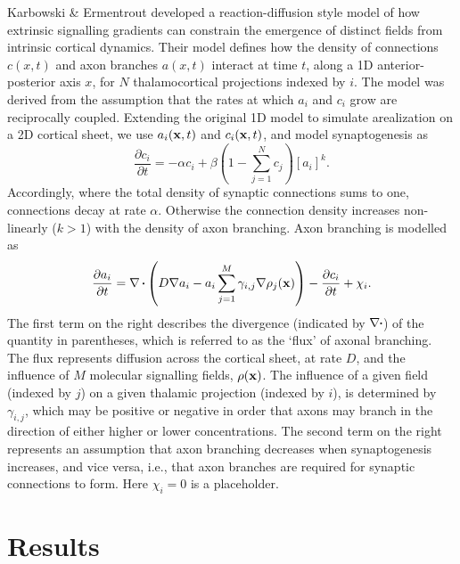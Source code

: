 \documentclass[9pt,twocolumn,twoside,lineno]{pnas-new}
\begin{document}
Karbowski \& Ermentrout \citep{karbowski_model_2004} developed a
reaction-diffusion style model of how extrinsic signalling gradients can
constrain the emergence of distinct fields from intrinsic cortical
dynamics. Their model defines how the density of connections $c(x,t)$ and axon
branches $a(x,t)$ interact at time $t$, along a 1D anterior-posterior axis
$x$, for $N$ thalamocortical projections indexed by $i$. The model was derived
from the assumption that the rates at which $a_i$ and $c_i$ grow are
reciprocally coupled. Extending the original 1D model to simulate arealization
on a 2D cortical sheet, we use $a_i(\mathbf{x},t)$ and $c_i(\mathbf{x},t)$, and model
synaptogenesis as
%
\begin{equation} \label{eq:dc}
\frac{\partial c_i}{\partial t} =-\alpha c_i +\beta  \left(1 - \sum_{j=1}^{N} c_{j}\right)[a_i]^k.
\end{equation}
%
Accordingly, where the total density of synaptic connections sums to one,
connections decay at rate $\alpha$. Otherwise the connection density increases
non-linearly ($k>1$) with the density of axon branching. Axon branching is
modelled as
%
\begin{equation} \label{eq:da}
\frac{\partial a_i}{\partial t} = \nabla\vcdot\left(D \nabla a_i-a_i\sum_{j=1}^{M} \gamma_{i,j}\nabla \rho_j(\mb{x})\right) - \frac{\partial c_i}{\partial t} + \chi_i.
\end{equation}
%
The first term on the right describes the divergence (indicated by
$\nabla\vcdot$) of the quantity in parentheses, which is referred to as the
`flux' of axonal branching. The flux represents diffusion across the cortical
sheet, at rate $D$, and the influence of $M$ molecular signalling fields,
$\rho(\mathbf{x})$. The influence of a given field (indexed by $j$) on a given
thalamic projection (indexed by $i$), is determined by $\gamma_{i,j}$, which
may be positive or negative in order that axons may branch in the direction of
either higher or lower concentrations. The second term on the right represents
an assumption that axon branching decreases when synaptogenesis increases, and
vice versa, i.e., that axon branches are required for synaptic connections to
form. Here $\chi_i=0$ is a placeholder.


\section*{Results}
\end{document}
